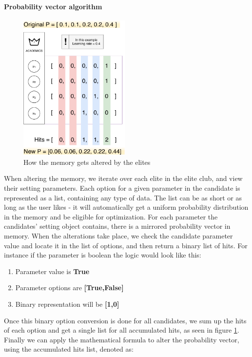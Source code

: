 \documentclass[a4paper,english]{report}
\begin{document}
		\paragraph{Probability vector algorithm}
		\begin{figure}
			\caption{How the memory gets altered by the elites}
			\label{fig:memory_insight}
			\includegraphics[width=5.5cm]{memory_insight}
		\end{figure} 
		When altering the memory, we iterate over each elite in the elite club, and view their setting parameters. Each option for a given parameter in the candidate is represented as a list, containing any type of data. The list can be as short or as long as the user likes - it will automatically get a uniform probability distribution in the memory and be eligible for optimization. For each parameter the candidates' setting object contains, there is a mirrored probability vector in memory. When the alterations take place, we check the candidate parameter value and locate it in the list of options, and then return a binary list of hits. For instance if the parameter is boolean the logic would look like this:
		\begin{enumerate}
			\item Parameter value is \textbf{True}
			\item Parameter options are \textbf{[True,False]}
			\item Binary representation will be \textbf{[1,0]}
		\end{enumerate}
		Once this binary option conversion is done for all candidates, we sum up the hits of each option and get a single list for all accumulated hits, as seen in figure \ref{fig:memory_insight}. Finally we can apply the mathematical formula to alter the probability vector, using the accumulated hits list, denoted as:\\
\end{document}
